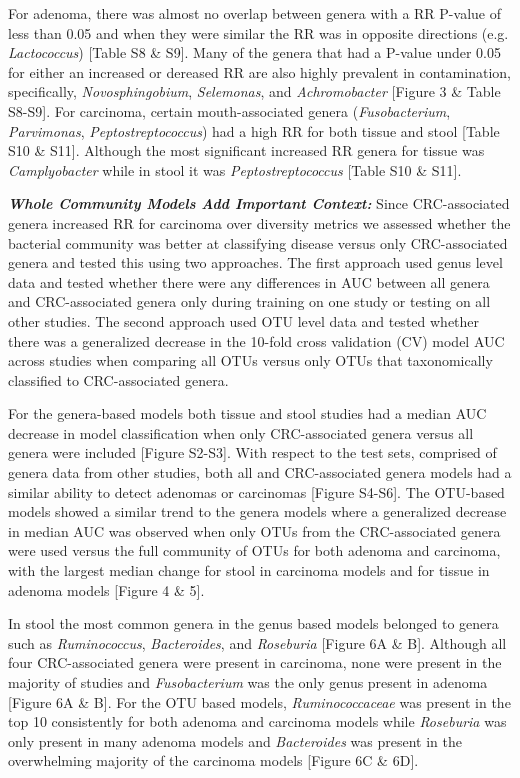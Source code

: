 \documentclass[12pt,]{article}
\begin{document}
For adenoma, there was almost no overlap between genera with a RR
P-value of less than 0.05 and when they were similar the RR was in
opposite directions (e.g. \emph{Lactococcus}) {[}Table S8 \& S9{]}. Many
of the genera that had a P-value under 0.05 for either an increased or
dereased RR are also highly prevalent in contamination, specifically,
\emph{Novosphingobium}, \emph{Selemonas}, and \emph{Achromobacter}
{[}Figure 3 \& Table S8-S9{]}. For carcinoma, certain mouth-associated
genera (\emph{Fusobacterium}, \emph{Parvimonas},
\emph{Peptostreptococcus}) had a high RR for both tissue and stool
{[}Table S10 \& S11{]}. Although the most significant increased RR
genera for tissue was \emph{Camplyobacter} while in stool it was
\emph{Peptostreptococcus} {[}Table S10 \& S11{]}.

\textbf{\emph{Whole Community Models Add Important Context:}} Since
CRC-associated genera increased RR for carcinoma over diversity metrics
we assessed whether the bacterial community was better at classifying
disease versus only CRC-associated genera and tested this using two
approaches. The first approach used genus level data and tested whether
there were any differences in AUC between all genera and CRC-associated
genera only during training on one study or testing on all other
studies. The second approach used OTU level data and tested whether
there was a generalized decrease in the 10-fold cross validation (CV)
model AUC across studies when comparing all OTUs versus only OTUs that
taxonomically classified to CRC-associated genera.

For the genera-based models both tissue and stool studies had a median
AUC decrease in model classification when only CRC-associated genera
versus all genera were included {[}Figure S2-S3{]}. With respect to the
test sets, comprised of genera data from other studies, both all and
CRC-associated genera models had a similar ability to detect adenomas or
carcinomas {[}Figure S4-S6{]}. The OTU-based models showed a similar
trend to the genera models where a generalized decrease in median AUC
was observed when only OTUs from the CRC-associated genera were used
versus the full community of OTUs for both adenoma and carcinoma, with
the largest median change for stool in carcinoma models and for tissue
in adenoma models {[}Figure 4 \& 5{]}.

In stool the most common genera in the genus based models belonged to
genera such as \emph{Ruminococcus}, \emph{Bacteroides}, and
\emph{Roseburia} {[}Figure 6A \& B{]}. Although all four CRC-associated
genera were present in carcinoma, none were present in the majority of
studies and \emph{Fusobacterium} was the only genus present in adenoma
{[}Figure 6A \& B{]}. For the OTU based models, \emph{Ruminococcaceae}
was present in the top 10 consistently for both adenoma and carcinoma
models while \emph{Roseburia} was only present in many adenoma models
and \emph{Bacteroides} was present in the overwhelming majority of the
carcinoma models {[}Figure 6C \& 6D{]}.
\end{document}
